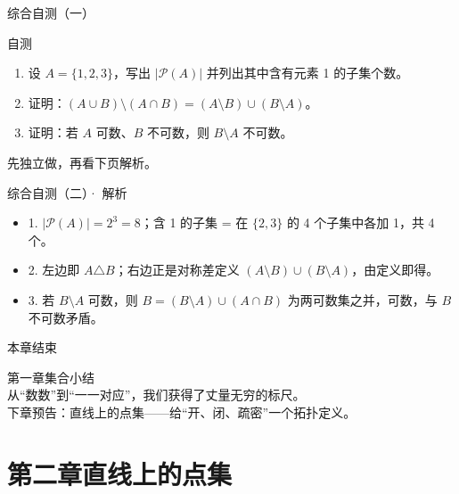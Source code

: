 \documentclass[aspectratio=169,11pt]{ctexbeamer}
\begin{document}
\begin{frame}{综合自测（一）}
  \begin{block}{自测}
    \begin{enumerate}
      \item 设 $A=\{1,2,3\}$，写出 $|\mathcal{P}(A)|$ 并列出其中含有元素 1 的子集个数。
      \item 证明：$(A\cup B)\setminus(A\cap B)=(A\setminus B)\cup(B\setminus A)$。
      \item 证明：若 $A$ 可数、$B$ 不可数，则 $B\setminus A$ 不可数。
    \end{enumerate}
  \end{block}
  \begin{center}
    \color{cloudgray}\small 先独立做，再看下页解析。
  \end{center}
\end{frame}

\begin{frame}{综合自测（二）· 解析}
  \begin{itemize}
    \item 1. $|\mathcal{P}(A)|=2^{3}=8$；含 1 的子集 = 在 $\{2,3\}$ 的 4 个子集中各加 1，共 4 个。
    \item 2. 左边即 $A\triangle B$；右边正是对称差定义 $(A\setminus B)\cup(B\setminus A)$，由定义即得。
    \item 3. 若 $B\setminus A$ 可数，则 $B=(B\setminus A)\cup(A\cap B)$ 为两可数集之并，可数，与 $B$ 不可数矛盾。
  \end{itemize}
\end{frame}

\begin{frame}{本章结束}
  \begin{center}
    {\color{clouddeep}\Large 第一章\quad 集合\quad 小结}\\[0.4cm]
    {\color{cloudgray}从“数数”到“一一对应”，我们获得了丈量无穷的标尺。}\\[0.6cm]
    {\color{cloudblue}下章预告：直线上的点集——给“开、闭、疏密”一个拓扑定义。}
  \end{center}
\end{frame}

\section{第二章\quad 直线上的点集}
\end{document}
